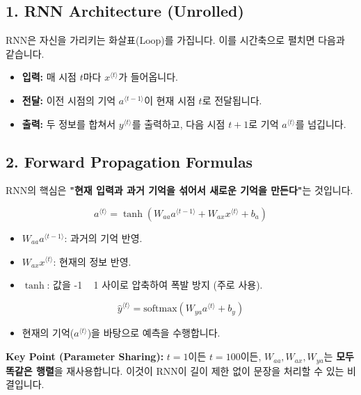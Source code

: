\documentclass[11pt,a4paper]{book}
\theoremstyle{definition}
\begin{document}
\subsection{1. RNN Architecture (Unrolled)}
RNN은 자신을 가리키는 화살표(Loop)를 가집니다. 이를 시간축으로 펼치면 다음과 같습니다.


\begin{itemize}
    \item \textbf{입력:} 매 시점 $t$마다 $x^{\langle t \rangle}$가 들어옵니다.
    \item \textbf{전달:} 이전 시점의 기억 $a^{\langle t-1 \rangle}$이 현재 시점 $t$로 전달됩니다.
    \item \textbf{출력:} 두 정보를 합쳐서 $y^{\langle t \rangle}$를 출력하고, 다음 시점 $t+1$로 기억 $a^{\langle t \rangle}$를 넘깁니다.
\end{itemize}

\subsection{2. Forward Propagation Formulas}
RNN의 핵심은 \textbf{"현재 입력과 과거 기억을 섞어서 새로운 기억을 만든다"}는 것입니다.

\begin{formulabox}[title={은닉 상태 업데이트 (기억 갱신)}]
$$ a^{\langle t \rangle} = \tanh(W_{aa}a^{\langle t-1 \rangle} + W_{ax}x^{\langle t \rangle} + b_a) $$
\begin{itemize}
    \item $W_{aa}a^{\langle t-1 \rangle}$: 과거의 기억 반영.
    \item $W_{ax}x^{\langle t \rangle}$: 현재의 정보 반영.
    \item $\tanh$: 값을 -1 ~ 1 사이로 압축하여 폭발 방지 (주로 사용).
\end{itemize}
\end{formulabox}

\begin{formulabox}[title={출력 계산}]
$$ \hat{y}^{\langle t \rangle} = \text{softmax}(W_{ya}a^{\langle t \rangle} + b_y) $$
\begin{itemize}
    \item 현재의 기억($a^{\langle t \rangle}$)을 바탕으로 예측을 수행합니다.
\end{itemize}
\end{formulabox}

\textbf{Key Point (Parameter Sharing):}
$t=1$이든 $t=100$이든, $W_{aa}, W_{ax}, W_{ya}$는 \textbf{모두 똑같은 행렬}을 재사용합니다. 이것이 RNN이 길이 제한 없이 문장을 처리할 수 있는 비결입니다.
\end{document}

